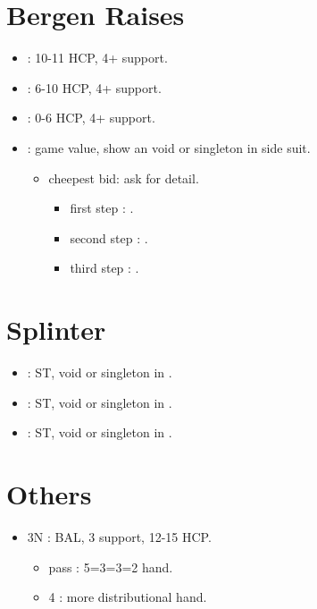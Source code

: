 \documentclass[12pt,twoside,a5paper]{report}%
\begin{document}
	\section*{Bergen Raises}
		\begin{itemize}
		\renewcommand{\labelitemi}{}
		\item {} : 10-11 HCP, 4+\sp{} support.
		\item {} : 6-10 HCP, 4+\sp{} support.
		\item {} : 0-6 HCP, 4+\sp{} support.
		\item {} : game value, show an void or singleton in side suit.
			\begin{itemize}
			\renewcommand{\labelitemi}{--}
			\item cheepest bid: ask for detail.
				\begin{itemize}
				\renewcommand{\labelitemi}{--}
					\item first step : \cl{}.
					\item second step : \di{}.
					\item third step : \sp{}.
				\end{itemize}
			\end{itemize}
		\end{itemize}

	\section*{Splinter}
	\begin{itemize}
	\renewcommand{\labelitemi}{}
	\item {} : ST, void or singleton in \cl{}.
	\item {} : ST, void or singleton in \di{}.
	\item {} : ST, void or singleton in \he{}.
	\end{itemize}

	\section*{Others}
	\begin{itemize}
	\renewcommand{\labelitemi}{}
	\item 3N : BAL, 3\sp{} support, 12-15 HCP.
		\begin{itemize}
		\renewcommand{\labelitemi}{--}
		\item pass : 5=3=3=2 hand.
		\item 4\sp{} : more distributional hand.
		\end{itemize}
	\end{itemize}
	
\end{document}
